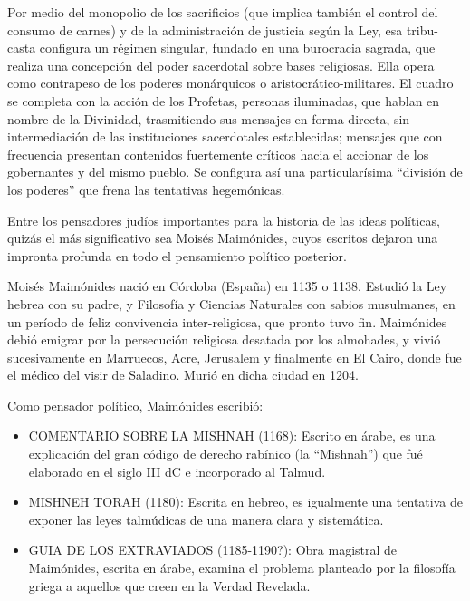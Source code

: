 \documentclass[
]{book}
\begin{document}
Por medio del monopolio de los sacrificios (que implica también el control del consumo de carnes) y de la administración de justicia según la Ley, esa tribu-casta configura un régimen singular, fundado en una burocracia sagrada, que realiza una concepción del poder sacerdotal sobre bases religiosas. Ella opera como contrapeso de los poderes monárquicos o aristocrático-militares. El cuadro se completa con la acción de los Profetas, personas iluminadas, que hablan en nombre de la Divinidad, trasmitiendo sus mensajes en forma directa, sin intermediación de las instituciones sacerdotales establecidas; mensajes que con frecuencia presentan contenidos fuertemente críticos hacia el accionar de los gobernantes y del mismo pueblo. Se configura así una particularísima ``división de los poderes'' que frena las tentativas hegemónicas.

Entre los pensadores judíos importantes para la historia de las ideas políticas, quizás el más significativo sea Moisés Maimónides, cuyos escritos dejaron una impronta profunda en todo el pensamiento político posterior.

Moisés Maimónides nació en Córdoba (España) en 1135 o 1138. Estudió la Ley hebrea con su padre, y Filosofía y Ciencias Naturales con sabios musulmanes, en un período de feliz convivencia inter-religiosa, que pronto tuvo fin. Maimónides debió emigrar por la persecución religiosa desatada por los almohades, y vivió sucesivamente en Marruecos, Acre, Jerusalem y finalmente en El Cairo, donde fue el médico del visir de Saladino. Murió en dicha ciudad en 1204.

Como pensador político, Maimónides escribió:

\begin{itemize}
\item
  COMENTARIO SOBRE LA MISHNAH (1168): Escrito en árabe, es una explicación del gran código de derecho rabínico (la ``Mishnah'') que fué elaborado en el siglo III dC e incorporado al Talmud.
\item
  MISHNEH TORAH (1180): Escrita en hebreo, es igualmente una tentativa de exponer las leyes talmúdicas de una manera clara y sistemática.
\item
  GUIA DE LOS EXTRAVIADOS (1185-1190?): Obra magistral de Maimónides, escrita en árabe, examina el problema planteado por la filosofía griega a aquellos que creen en la Verdad Revelada.
\end{itemize}
\end{document}
